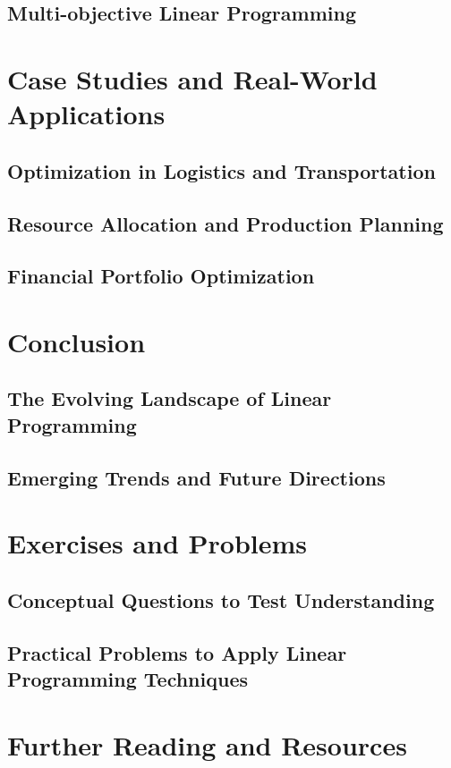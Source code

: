 \documentclass[12pt]{book} %
\begin{document}
\subsection{Multi-objective Linear Programming}

\section{Case Studies and Real-World Applications}
\subsection{Optimization in Logistics and Transportation}
\subsection{Resource Allocation and Production Planning}
\subsection{Financial Portfolio Optimization}

\section{Conclusion}
\subsection{The Evolving Landscape of Linear Programming}
\subsection{Emerging Trends and Future Directions}

\section{Exercises and Problems}
\subsection{Conceptual Questions to Test Understanding}
\subsection{Practical Problems to Apply Linear Programming Techniques}

\section{Further Reading and Resources}
\end{document}
